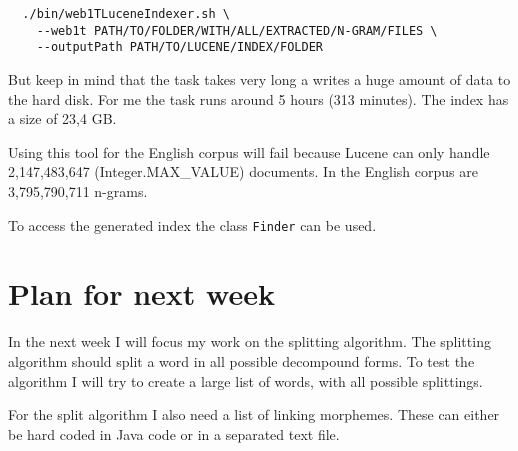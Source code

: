 \documentclass[11pt, accentcolor=tud9b, nochapname]{tudexercise}
\begin{document}
\begin{lstlisting}
  ./bin/web1TLuceneIndexer.sh \ 
    --web1t PATH/TO/FOLDER/WITH/ALL/EXTRACTED/N-GRAM/FILES \
    --outputPath PATH/TO/LUCENE/INDEX/FOLDER
\end{lstlisting}

But keep in mind that the task takes very long a writes a huge amount
of data to the hard disk. For me the task runs around 5 hours (313
minutes). The index has a size of 23,4 GB.

Using this tool for the English corpus will fail because Lucene can
only handle 2,147,483,647 (Integer.MAX\_VALUE) documents. In the
English corpus are 3,795,790,711 n-grams.

To access the generated index the class \texttt{Finder} can be used.

\section{Plan for next week}
In the next week I will focus my work on the splitting algorithm. The
splitting algorithm should split a word in all possible decompound
forms. To test the algorithm I will try to create a large list of
words, with all possible splittings.

For the split algorithm I also need a list of linking morphemes. These can either be hard coded in Java code or in a separated text file.
\end{document}
